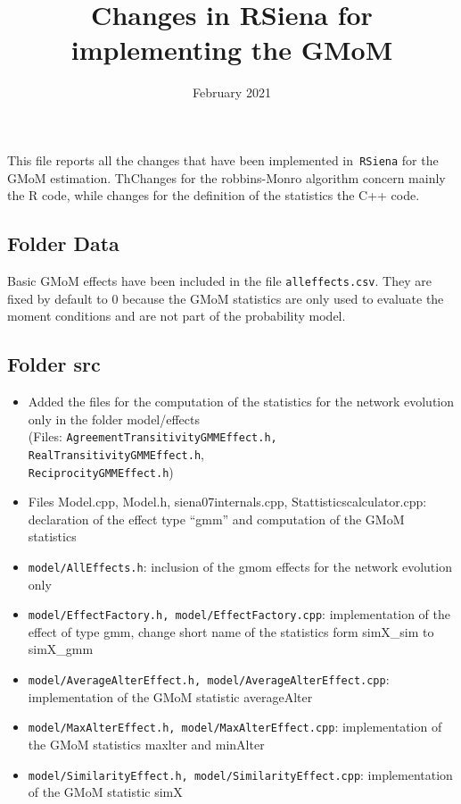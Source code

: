 \documentclass[a4paper,11pt]{article}
\title{Changes in RSiena for implementing the GMoM}
\author{}
\date{February 2021}
\begin{document}
\maketitle
This file reports all the changes that have been implemented in\texttt{ RSiena} for the GMoM estimation. ThChanges for the robbins-Monro algorithm concern mainly the R code, while changes for the definition of the statistics the C++ code.

\subsection*{Folder Data}
Basic GMoM effects have been included in the file \texttt{alleffects.csv}. They are fixed by default to 0 because the GMoM statistics are only used to evaluate the moment conditions and are not part of the probability model.

\subsection*{Folder src}
\begin{itemize}
\item Added the files for the computation of the statistics for the network evolution only in the folder model/effects\\
(Files: \texttt{AgreementTransitivityGMMEffect.h, RealTransitivityGMMEffect.h},\\\texttt{ReciprocityGMMEffect.h})
	\item Files Model.cpp, Model.h, siena07internals.cpp, Stattisticscalculator.cpp: declaration of the effect type ``gmm'' and computation of the GMoM statistics
	\item \texttt{model/AllEffects.h}: inclusion of the gmom effects for the network evolution only
	\item \texttt{model/EffectFactory.h, model/EffectFactory.cpp}: implementation of the effect of type gmm, change short name of the statistics form simX\_sim to simX\_gmm
	\item \texttt{model/AverageAlterEffect.h, model/AverageAlterEffect.cpp}: implementation of the GMoM statistic averageAlter 
	\item \texttt{model/MaxAlterEffect.h, model/MaxAlterEffect.cpp}: implementation of the GMoM statistics maxlter and minAlter
	\item \texttt{model/SimilarityEffect.h, model/SimilarityEffect.cpp}: implementation of the GMoM statistic simX 
\end{itemize}
\end{document}
